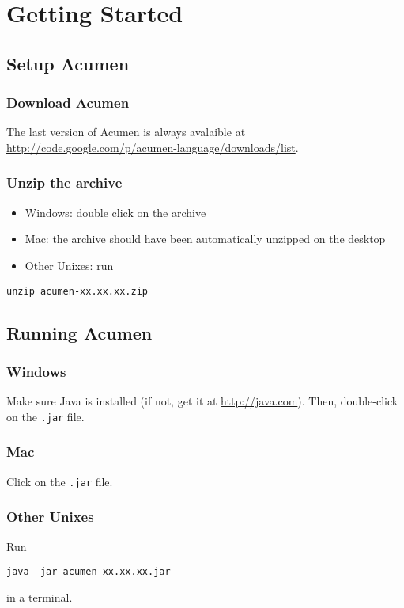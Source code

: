 \section{Getting Started}

\subsection{Setup Acumen}

\subsubsection{Download Acumen}

The last version of Acumen is always avalaible at \url{http://code.google.com/p/acumen-language/downloads/list}.

\subsubsection{Unzip the archive}

\begin{itemize}
    \item Windows: double click on the archive
    \item Mac: the archive should have been automatically unzipped on the desktop
    \item Other Unixes: run
\end{itemize}

\begin{lstlisting}
unzip acumen-xx.xx.xx.zip
\end{lstlisting}

\subsection{Running Acumen}
\subsubsection{Windows}

Make sure Java is installed (if not, get it at \url{http://java.com}). Then, double-click on the \lstinline{.jar} file.
\subsubsection{Mac}

Click on the \lstinline{.jar} file.
\subsubsection{Other Unixes}

Run
\begin{lstlisting}
java -jar acumen-xx.xx.xx.jar
\end{lstlisting}
in a terminal.

